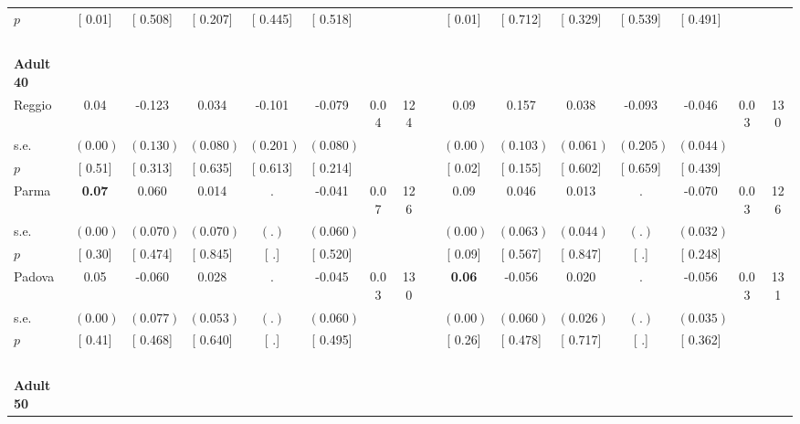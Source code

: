 \begin{longtable}{L{8em} c c c c c c c p{1em} c c c c c c c}
\quad \quad \quad \quad $ p$ & [     0.01] & [    0.508] & [    0.207] & [    0.445] & [    0.518] & & & & [     0.01] & [    0.712] & [    0.329] & [    0.539] & [    0.491] & &  \\[1em]
~\\[1em]
\quad \quad \textbf{Adult 40} & & & & & & & & & & & & & & & \\* 
\quad \quad \quad Reggio& 0.04 &    -0.123 &     0.034 &    -0.101 &    -0.079 &      0.04 &       124 & & 0.09 &     0.157 &     0.038 &    -0.093 &    -0.046 &      0.03 &       130  \\*
\quad \quad \quad \quad s.e.& $ (     0.00)$ & $ (    0.130)$ & $ (    0.080)$ & $ (    0.201)$ & $ (    0.080)$ & & & & $ (     0.00)$ & $ (    0.103)$ & $ (    0.061)$ & $ (    0.205)$ & $ (    0.044)$ & &  \\*
\quad \quad \quad \quad $ p$ & [     0.51] & [    0.313] & [    0.635] & [    0.613] & [    0.214] & & & & [     0.02] & [    0.155] & [    0.602] & [    0.659] & [    0.439] & &  \\[1em]
\quad \quad \quad Parma& \textbf{     0.07} &     0.060 &     0.014 &         . &    -0.041 &      0.07 &       126 & & 0.09 &     0.046 &     0.013 &         . &    -0.070 &      0.03 &       126  \\*
\quad \quad \quad \quad s.e.& $ (     0.00)$ & $ (    0.070)$ & $ (    0.070)$ & $ (        .)$ & $ (    0.060)$ & & & & $ (     0.00)$ & $ (    0.063)$ & $ (    0.044)$ & $ (        .)$ & $ (    0.032)$ & &  \\*
\quad \quad \quad \quad $ p$ & [     0.30] & [    0.474] & [    0.845] & [        .] & [    0.520] & & & & [     0.09] & [    0.567] & [    0.847] & [        .] & [    0.248] & &  \\[1em]
\quad \quad \quad Padova& 0.05 &    -0.060 &     0.028 &         . &    -0.045 &      0.03 &       130 & & \textbf{     0.06} &    -0.056 &     0.020 &         . &    -0.056 &      0.03 &       131  \\*
\quad \quad \quad \quad s.e.& $ (     0.00)$ & $ (    0.077)$ & $ (    0.053)$ & $ (        .)$ & $ (    0.060)$ & & & & $ (     0.00)$ & $ (    0.060)$ & $ (    0.026)$ & $ (        .)$ & $ (    0.035)$ & &  \\*
\quad \quad \quad \quad $ p$ & [     0.41] & [    0.468] & [    0.640] & [        .] & [    0.495] & & & & [     0.26] & [    0.478] & [    0.717] & [        .] & [    0.362] & &  \\[1em]
~\\[1em]
\quad \quad \textbf{Adult 50} & & & & & & & & & & & & & & & \\* 

\end{longtable}
